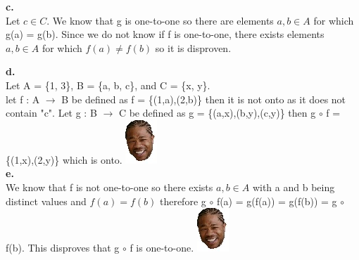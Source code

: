 \textbf{c.}\\
Let $c \in C$. We know that g is one-to-one so there are elements $a,b \in A$ for which g(a) = g(b). Since we do not know if f is one-to-one, there exists elements $a,b \in A$ for which $f(a) \neq f(b)$ so it is disproven.

\textbf{d.}\\
Let A = \{1, 3\}, B = \{a, b, c\}, and C = \{x, y\}.\\
let f : A $\rightarrow$ B be defined as f = \{(1,a),(2,b)\} then it is not onto as it does not contain "c". Let g : B $\rightarrow$ C be defined as g = \{(a,x),(b,y),(c,y)\} then g $\circ$ f = \{(1,x),(2,y)\} which is onto.  \includegraphics[scale=0.70]{billeder/xzibit}\\

\textbf{e.}\\
We know that f is not one-to-one so there exists $a,b \in A$ with a and b being distinct values and $f(a) = f(b)$ therefore g $\circ$ f(a) = g(f(a)) = g(f(b)) = g $\circ$ f(b). This disproves that g $\circ$ f is one-to-one. \includegraphics[scale=0.70]{billeder/xzibit}\\

